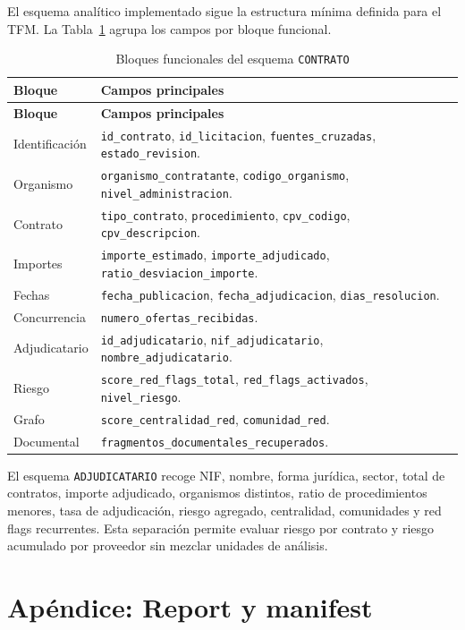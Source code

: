 \documentclass[11pt,a4paper,spanish]{book}
\numberwithin{equation}{chapter}
\numberwithin{figure}{chapter}
\begin{document}
El esquema anal{\'i}tico implementado sigue la estructura m{\'i}nima definida para el TFM.
La Tabla~\ref{tab:contrato_schema_resumen} agrupa los campos por bloque funcional.

{\small
\begin{longtable}{p{3.5cm}p{9.6cm}}
\caption{Bloques funcionales del esquema \texttt{CONTRATO}}
\label{tab:contrato_schema_resumen}\\
\toprule
\textbf{Bloque} & \textbf{Campos principales} \\
\midrule
\endfirsthead
\toprule
\textbf{Bloque} & \textbf{Campos principales} \\
\midrule
\endhead
Identificaci{\'o}n & \texttt{id\_contrato}, \texttt{id\_licitacion}, \texttt{fuentes\_cruzadas}, \texttt{estado\_revision}. \\
Organismo & \texttt{organismo\_contratante}, \texttt{codigo\_organismo}, \texttt{nivel\_administracion}. \\
Contrato & \texttt{tipo\_contrato}, \texttt{procedimiento}, \texttt{cpv\_codigo}, \texttt{cpv\_descripcion}. \\
Importes & \texttt{importe\_estimado}, \texttt{importe\_adjudicado}, \texttt{ratio\_desviacion\_importe}. \\
Fechas & \texttt{fecha\_publicacion}, \texttt{fecha\_adjudicacion}, \texttt{dias\_resolucion}. \\
Concurrencia & \texttt{numero\_ofertas\_recibidas}. \\
Adjudicatario & \texttt{id\_adjudicatario}, \texttt{nif\_adjudicatario}, \texttt{nombre\_adjudicatario}. \\
Riesgo & \texttt{score\_red\_flags\_total}, \texttt{red\_flags\_activados}, \texttt{nivel\_riesgo}. \\
Grafo & \texttt{score\_centralidad\_red}, \texttt{comunidad\_red}. \\
Documental & \texttt{fragmentos\_documentales\_recuperados}. \\
\bottomrule
\end{longtable}
}

El esquema \texttt{ADJUDICATARIO} recoge NIF, nombre, forma jur{\'i}dica, sector, total de contratos,
importe adjudicado, organismos distintos, ratio de procedimientos menores, tasa de adjudicaci{\'o}n,
riesgo agregado, centralidad, comunidades y red flags recurrentes. Esta separaci{\'o}n permite
evaluar riesgo por contrato y riesgo acumulado por proveedor sin mezclar unidades de an{\'a}lisis.

\chapter{Ap{\'e}ndice: Report y manifest}
\label{ap:manifest_report}
\end{document}

